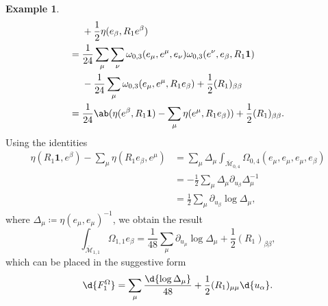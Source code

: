 \documentclass[10pt,oldfontcommands,oneside]{memoir}
\theoremstyle{definition}
\newtheorem{exm}[thm]{Example}
\theoremstyle{remark}
\theoremstyle{plain}
\theoremstyle{definition}
\theoremstyle{remark}
\newcommand{\Mbar}{\overline{\mathcal{M}}}
\newcommand{\1}{\mathbf{1}}
\newcommand{\2}{\mathbf{2}}
\newcommand{\3}{\mathbf{3}}
\begin{document}
\begin{exm}
\begin{align*}
        &+ \frac{1}{2} \eta(e_{\beta}, R_1 e^{\beta}) \\
        ={}& \frac{1}{24} \sum_{\mu}\sum_{\nu} \omega_{0,3}(e_{\mu}, e^{\mu}, e_{\nu})\omega_{0,3}(e^{\nu}, e_{\beta}, R_1 \1) \\
        &-\frac{1}{24} \sum_{\mu} \omega_{0,3}(e_{\mu}, e^{\mu}, R_1 e_{\beta}) + \frac{1}{2} (R_1)_{\beta\beta} \\
        ={}& \frac{1}{24} \ab(\eta(e^{\beta}, R_1 \1) - \sum_{\mu} \eta(e^{\mu}, R_1 e_{\beta})) + \frac{1}{2} (R_1)_{\beta\beta}.
    \end{align*}
    Using the identities
    \begin{equation}\label{eqn:m04identities}
    \begin{aligned}
        \eta(R_1 \1, e^{\beta}) - \sum_{\mu} \eta(R_1 e_{\beta}, e^{\mu}) &= \sum_{\mu} \Delta_{\mu} \int_{\Mbar_{0,4}} \Omega_{0,4}(e_{\mu}, e_{\mu}, e_{\mu}, e_{\beta}) \\
        &= -\frac{1}{2}\sum_{\mu} \Delta_{\mu} \partial_{u_{\beta}} \Delta_{\mu}^{-1} \\
        &= \frac{1}{2} \sum_{\mu} \partial_{u_{\beta}} \log \Delta_{\mu},
    \end{aligned}
    \end{equation}
    where $\Delta_{\mu} \coloneqq \eta(e_{\mu}, e_{\mu})^{-1}$, we obtain the result
    \[ \int_{\Mbar_{1,1}} \Omega_{1,1} e_{\beta} = \frac{1}{48} \sum_{\mu} \partial_{u_{\mu}} \log \Delta_{\mu} + \frac{1}{2} (R_1)_{\beta\beta}, \]
    which can be placed in the suggestive form
    \[ \d{F_1^{\Omega}} = \sum_{\mu} \frac{\d{\log \Delta_{\mu}}}{48} + \frac{1}{2} (R_1)_{\mu\mu} \d{u_{\alpha}}. \]


\end{exm}
\end{document}
